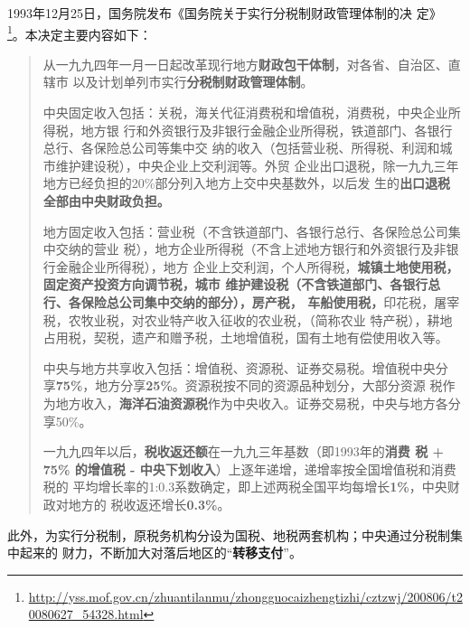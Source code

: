 1993年12月25日，国务院发布《国务院关于实行分税制财政管理体制的决
定》
\footnote{\url{http://yss.mof.gov.cn/zhuantilanmu/zhongguocaizhengtizhi/cztzwj/200806/t20080627_54328.html}}。本决定主要内容如下：

\begin{quotation}
  从一九九四年一月一日起改革现行地方\textbf{财政包干体制}，对各省、自治区、直辖市
  以及计划单列市实行\textbf{分税制财政管理体制}。

  中央固定收入包括：关税，海关代征消费税和增值税，消费税，中央企业所得税，地方银
  行和外资银行及非银行金融企业所得税，铁道部门、各银行总行、各保险总公司等集中交
  纳的收入（包括营业税、所得税、利润和城市维护建设税），中央企业上交利润等。外贸
  企业出口退税，除一九九三年地方已经负担的20\%部分列入地方上交中央基数外，以后发
  生的\textbf{出口退税全部由中央财政负担。}

  地方固定收入包括：营业税（不含铁道部门、各银行总行、各保险总公司集中交纳的营业
  税），地方企业所得税（不含上述地方银行和外资银行及非银行金融企业所得税），地方
  企业上交利润，个人所得税，\textbf{城镇土地使用税，固定资产投资方向调节税，城市
    维护建设税（不含铁道部门、各银行总行、各保险总公司集中交纳的部分），房产税，
    车船使用税，}印花税，屠宰税，农牧业税，对农业特产收入征收的农业税，（简称农业
  特产税），耕地占用税，契税，遗产和赠予税，土地增值税，国有土地有偿使用收入等。

  中央与地方共享收入包括：增值税、资源税、证券交易税。增值税中央分
  享\textbf{75\%}，地方分享\textbf{25\%}。资源税按不同的资源品种划分，大部分资源
  税作为地方收入，\textbf{海洋石油资源税}作为中央收入。证券交易税，中央与地方各分
  享50\%。

  一九九四年以后，\textbf{税收返还额}在一九九三年基数（即1993年的\textbf{消费
    税 + 75\% 的增值税 - 中央下划收入}）上逐年递增，递增率按全国增值税和消费税的
  平均增长率的1:0.3系数确定，即上述两税全国平均每增长\textbf{1\%}，中央财政对地方的
  税收返还增长\textbf{0.3\%}。
\end{quotation}

此外，为实行分税制，原税务机构分设为国税、地税两套机构；中央通过分税制集中起来的
财力，不断加大对落后地区的“\textbf{转移支付}”。

